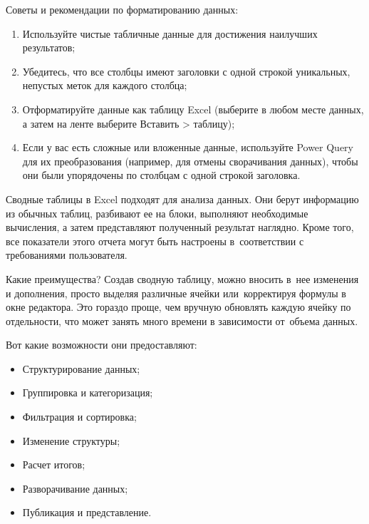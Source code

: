 \documentclass{ou}
\begin{document}
Советы и рекомендации по форматированию данных:
\begin{enumerate}[leftmargin=0em, itemindent=3.75em, nosep, label=\arabic*)]
\item Используйте чистые табличные данные для достижения наилучших результатов;
\item Убедитесь, что все столбцы имеют заголовки с одной строкой уникальных, непустых меток для каждого столбца;
\item Отформатируйте данные как таблицу Excel (выберите в любом месте данных, а затем на ленте выберите Вставить > таблицу);
\item Если у вас есть сложные или вложенные данные, используйте Power Query для их преобразования (например, для отмены сворачивания данных), чтобы они были упорядочены по столбцам с одной строкой заголовка.
\end{enumerate}

Сводные таблицы в Excel подходят для анализа данных. Они берут информацию из обычных таблиц, разбивают ее на блоки, выполняют необходимые вычисления, а затем представляют полученный результат наглядно. Кроме того, все показатели этого отчета могут быть настроены в~соответствии с требованиями пользователя.

Какие преимущества? Создав сводную таблицу, можно вносить в~нее изменения и дополнения, просто выделяя различные ячейки или~корректируя формулы в окне редактора. Это гораздо проще, чем вручную обновлять каждую ячейку по отдельности, что может занять много времени в зависимости от~объема данных.

Вот какие возможности они предоставляют:
\begin{itemize}[label=-, leftmargin=0em, itemindent=3.35em, nosep]
\item Структурирование данных;
\item Группировка и категоризация;
\item Фильтрация и сортировка;
\item Изменение структуры;
\item Расчет итогов;
\item Разворачивание данных;
\item Публикация и представление.
\end{itemize}
\end{document}
